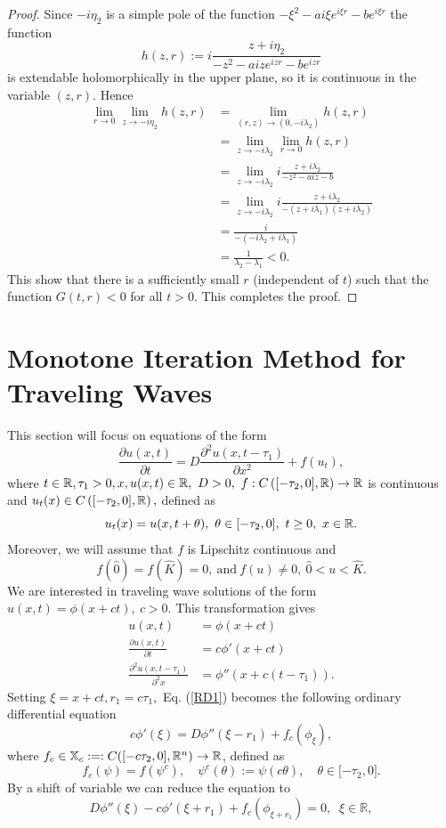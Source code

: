 \documentclass[12pt,letterpaper]{amsart}
\theoremstyle{definition}
\theoremstyle{remark}
\numberwithin{equation}{section}
\begin{document}
\begin{proof}
Since $-i\eta_2$ is a simple pole of the function  $-\xi^2-ai\xi e^{i\xi r}-be^{i\xi r}$ the function
$$
h(z,r):= i\frac{z+i\eta_2}{-z^2-aize^{iz r}-be^{iz r}}
$$
is extendable holomorphically in the upper plane, so it is continuous in the variable $(z,r)$. Hence
\begin{align*}
 \lim_{r\to 0}   \lim_{z\to - i\eta_2}   h(z,r) &= \lim_{(r,z)\to (0,-i\lambda_2)}h(z,r)\\
 &=\lim_{z\to -i\lambda_2}\lim_{r\to 0} h(z,r)\\
 &=\lim_{z\to -i\lambda_2}i\frac{z+i\lambda_2}{-z^2-aiz-b}\\
 &=\lim_{z\to -i\lambda_2}i\frac{z+i\lambda_2}{-(z+i\lambda_1)(z+i\lambda_2)}\\
 &= \frac{i}{-(-i\lambda_2+i\lambda_1)}\\
 &=\frac{1}{ \lambda_2-\lambda_1} <0.
\end{align*}
This show that there is a sufficiently small $r$ (independent of $t$) such that the function $G(t,r) <0$ for all $t >0$. This completes the proof.

\end{proof}

\section{Monotone Iteration Method for Traveling Waves}\label{monotone iteration}
This section will focus on equations of the form 
\begin{equation}\label{RD1}
\frac{\partial u(x,t)}{\partial t}=D\frac{\partial^2 u(x,t-\tau_1)}{\partial x^2} +f(u_t),
\end{equation}
where $t\in\mathbb R, \tau_1>0,  x, u(x,t)\in \mathbb R, \ D>0, \ f:C\left([-\tau_2,0], \mathbb R\right)\to \mathbb R$ is continuous and $u_t(x)\in C\left([-\tau_2,0], \mathbb R\right),$ defined as 
\[u_t(x)=u(x, t+\theta), \ \theta\in [-\tau_2,0], \ t\ge 0, \ x\in \mathbb R.\]
Moreover, we will assume that $f$ is Lipschitz continuous and 
\[f(\hat 0)=f(\hat K)=0, \ \text{and} \ f(u)\neq 0, \ \hat 0<u< \hat K.\]
We are interested in traveling wave solutions of the form $u(x,t)=\phi(x+ct), \ c>0.$ This transformation gives 
\begin{align*}\label{RD2}
u(x,t)&=\phi(x+ct)\\
\frac{\partial u(x,t)}{\partial t}&= c\phi'(x+ct)\\
\frac{\partial^2 u(x,t-\tau_1)}{\partial^2 x}&=\phi''(x+c(t-\tau_1)).
\end{align*}
Setting $\xi=x+ct, r_1=c\tau_1,$ Eq. (\ref{RD1}) becomes the following ordinary differential equation
\begin{equation}\label{W1}
c\phi'(\xi)=D\phi''(\xi-r_1)+f_c(\phi_\xi ),    
\end{equation}
where
$f_{c}\in \mathbb X_c:= :C([-c\tau_2,0],\mathbb{R}^{n})\rightarrow\mathbb{R}$,
defined as
\[
f_{c}(\psi)=f(\psi^{c}),\quad\psi^{c}(\theta):=\psi(c\theta),\quad\theta
\in\lbrack-\tau_2,0].
\]
By a shift of variable we can reduce the equation to 
\begin{equation}\label{wave}
D\phi'' (\xi)-c\phi' (\xi+r_1)+f_{c}(\phi_{\xi+r_1})=0,\;\;\xi
\in\mathbb{R},
\end{equation}
\end{document}
